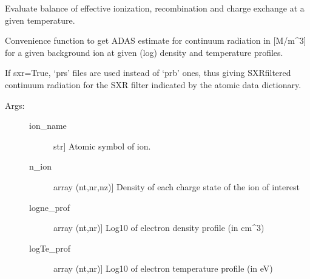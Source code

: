 \documentclass[letterpaper,10pt,english]{sphinxmanual}
\begin{document}
\begin{fulllineitems}
\label{\detokenize{aurora:aurora.atomic.balance}}
Evaluate balance of effective ionization, recombination and charge exchange at a given temperature.

\end{fulllineitems}


\begin{fulllineitems}
\label{\detokenize{aurora:aurora.atomic.get_adas_continuum_rad}}
Convenience function to get ADAS estimate for continuum radiation in {[}M/m\textasciicircum{}3{]} for a 
given background ion at given (log) density and temperature profiles.

If sxr=True, ‘prs’ files are used instead of ‘prb’ ones, thus giving SXR\sphinxhyphen{}filtered
continuum radiation for the SXR filter indicated by the atomic data dictionary.
\begin{description}
\item[{Args:}] \leavevmode\begin{description}
\item[{ion\_name}] \leavevmode{[}str{]}
Atomic symbol of ion.

\item[{n\_ion}] \leavevmode{[}array (nt,nr,nz){]}
Density of each charge state of the ion of interest

\item[{logne\_prof}] \leavevmode{[}array (nt,nr){]}
Log\sphinxhyphen{}10 of electron density profile (in cm\textasciicircum{}\sphinxhyphen{}3)

\item[{logTe\_prof}] \leavevmode{[}array (nt,nr){]}
Log\sphinxhyphen{}10 of electron temperature profile (in eV)


\end{description}
\end{description}
\end{fulllineitems}
\end{document}
